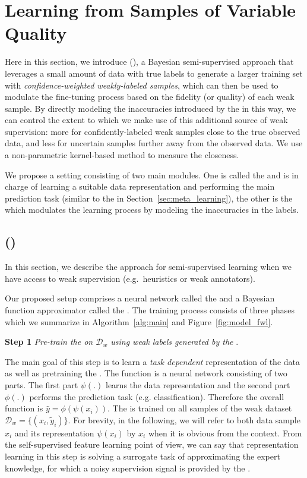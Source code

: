 \newcommand{\tfunc}{T} %
\section{Learning from Samples of Variable Quality}
\label{sec:fidelity_weighted_learning}
Here in this section, we introduce \fwlfull (\fwl), a Bayesian semi-supervised approach that leverages a small amount of data with true labels to generate a larger training set with \emph{confidence-weighted weakly-labeled samples}, which can then be used to modulate the fine-tuning process based on the fidelity (or quality) of each weak sample. By directly modeling the inaccuracies introduced by the \wa in this way, we can control the extent to which we make use of this additional source of weak supervision: more for confidently-labeled weak samples close to the true observed data, and less for uncertain samples further away from the observed data. We use a non-parametric kernel-based method to measure the closeness.

We propose a setting consisting of two main modules. One is called the \std and is in charge of learning a suitable data representation and performing the main prediction task (similar to the \tnet in Section~\ref{sec:meta_learning}), the other is the \tch which modulates the learning process by modeling the inaccuracies in the labels. 


\subsection{\fwlfull (\fwl)}
\label{sec:proposed-method}
In this section, we describe the \fwl approach for semi-supervised learning when we have access to weak supervision (e.g.\ heuristics or weak annotators). 


Our proposed setup comprises a neural network called the \textbf{\std} and a Bayesian function approximator called the \textbf{\tch}. The training process consists of three phases which we summarize in Algorithm~\ref{alg:main} and Figure~\ref{fig:model_fwl}.

\textbf{Step 1} \emph{Pre-train the \std on $\mathcal{D}_w$ using weak labels generated by the \wa}. 

The main goal of this step is to learn a \emph{task dependent} representation of the data as well as pretraining the \std. The \std function is a neural network consisting of two parts. The first part $\psi(.)$ learns the data representation and the second part $\phi(.)$ performs the prediction task (e.g. classification). Therefore the overall function is $\hat{y}=\phi(\psi(x_i))$. The \std is trained on all samples of the weak dataset $\mathcal{D}_w=\{(x_i, \tilde{y}_i)\}$. For brevity, in the following, we will refer to both data sample $x_i$ and its representation $\psi(x_i)$ by $x_i$ when it is obvious from the context. 
From the self-supervised feature learning point of view, we can say that representation learning in this step is solving a surrogate task of approximating the expert knowledge, for which a noisy supervision signal is provided by the \wa.  


